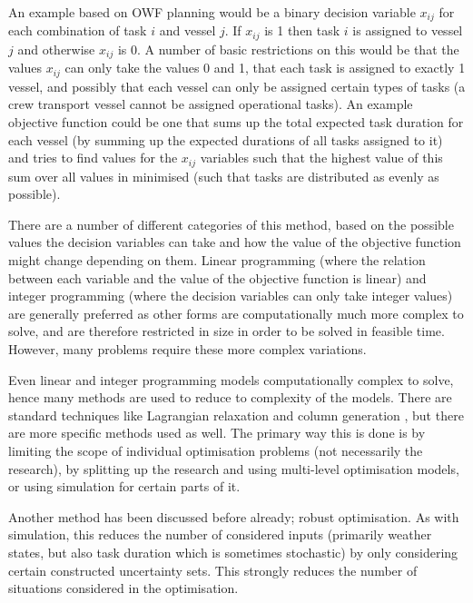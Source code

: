 \documentclass[a4paper,12pt]{article}
\begin{document}
An example based on OWF planning would be a binary decision variable $x_{ij}$ for each combination of task $i$ and vessel $j$. If $x_{ij}$ is 1 then task $i$ is assigned to vessel $j$ and otherwise $x_{ij}$ is 0. A number of basic restrictions on this would be that the values $x_{ij}$ can only take the values 0 and 1, that each task is assigned to exactly 1 vessel, and possibly that each vessel can only be assigned certain types of tasks (a crew transport vessel cannot be assigned operational tasks). An example objective function could be one that sums up the total expected task duration for each vessel (by summing up the expected durations of all tasks assigned to it) and tries to find values for the $x_{ij}$ variables such that the highest value of this sum over all values in minimised (such that tasks are distributed as evenly as possible). 

There are a number of different categories of this method, based on the possible values the decision variables can take and how the value of the objective function might change depending on them. Linear programming (where the relation between each variable and the value of the objective function is linear) and integer programming (where the decision variables can only take integer values) are generally preferred as other forms are computationally much more complex to solve, and are therefore restricted in size in order to be solved in feasible time. However, many problems require these more complex variations.

Even linear and integer programming models computationally complex to solve, hence many methods are used to reduce to complexity of the models. There are standard techniques like Lagrangian relaxation \cite{fisher1981lagrangian} and column generation \cite{barnhart1998branch}, but there are more specific methods used as well. The primary way this is done is by limiting the scope of individual optimisation problems (not necessarily the research), by splitting up the research and using multi-level optimisation models, or using simulation for certain parts of it. 

Another method has been discussed before already; robust optimisation. As with simulation, this reduces the number of considered inputs (primarily weather states, but also task duration which is sometimes stochastic) by only considering certain constructed uncertainty sets. This strongly reduces the number of situations considered in the optimisation. 

\bigskip
\end{document}
